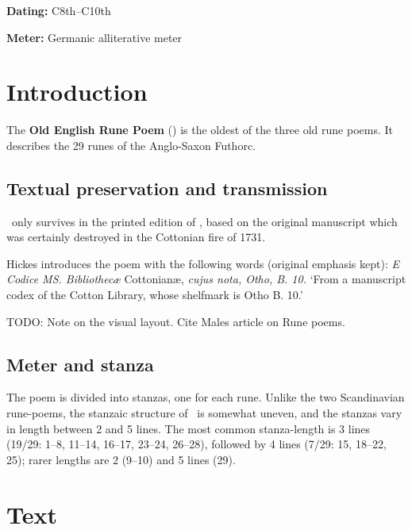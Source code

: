 
\begin{flushright}%
\textbf{Dating:} C8th--C10th%

\textbf{Meter:} Germanic alliterative meter
\end{flushright}%

\section{Introduction}

The \textbf{Old English Rune Poem} (\EnglishRunePoem) is the oldest of the three old rune poems.  It describes the 29 runes of the Anglo-Saxon Futhorc.

\subsection{Textual preservation and transmission}

\EnglishRunePoem\ only survives in the printed edition of \textcite[\nopp vol. 1, pp. 135]{Hickes1703}, based on the original manuscript which was certainly destroyed in the Cottonian fire of 1731.

Hickes introduces the poem with the following words (original emphasis kept): \emph{E Codice MS. Bibliothecæ} Cottonianæ, \emph{cujus nota, Otho, B. 10.} ‘From a manuscript codex of the Cotton Library, whose shelfmark is Otho B. 10.’

TODO: Note on the visual layout.  Cite Males article on Rune poems.

\subsection{Meter and stanza}

The poem is divided into stanzas, one for each rune.  Unlike the two Scandinavian rune-poems, the stanzaic structure of \EnglishRunePoem\ is somewhat uneven, and the stanzas vary in length between 2 and 5 lines.  The most common stanza-length is 3 lines (19/29: 1--8, 11--14, 16--17, 23--24, 26--28), followed by 4 lines (7/29: 15, 18--22, 25); rarer lengths are 2 (9--10) and 5 lines (29).

\sectionline

\section{Text}

